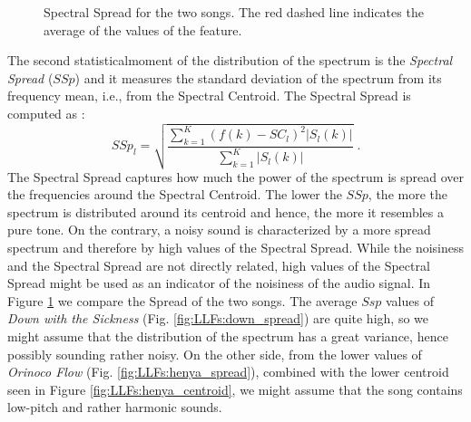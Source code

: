 \begin{figure}[tb]
	\centering
	 \hfil
	\caption{Spectral Spread for the two songs. The red dashed line indicates the average of the values of the feature.}
	\label{fig:LLFs:spread}          
\end{figure}

The second statisticalmoment of the distribution of the spectrum is the \textit{Spectral Spread} ($SSp$) and it measures the standard deviation of the spectrum from its frequency mean, i.e., from the Spectral Centroid. The Spectral Spread is computed as :
\begin{equation}\label{eq:FSS}
SSp_l = \sqrt{\frac{\sum\limits_{k=1}^{K}(f(k)-SC_l)^2 |S_l(k)|}{\sum\limits_{k=1}^{K}|S_l(k)|}} \;.
\end{equation}
The Spectral Spread captures how much the power of the spectrum is spread over the frequencies around the Spectral Centroid. The lower the $SSp$, the more the spectrum is distributed around its centroid and hence, the more it resembles a pure tone. On the contrary, a noisy sound is characterized by a more spread spectrum and therefore by high values of the Spectral Spread. While the noisiness and the Spectral Spread are not directly related, high values of the Spectral Spread might be used as an indicator of the noisiness of the audio signal. In Figure \ref{fig:LLFs:spread} we compare the Spread of the two songs. The average $Ssp$ values of \textit{Down with the Sickness} (Fig. \ref{fig:LLFs:down_spread}) are quite high, so we might assume that the distribution of the spectrum has a great variance, hence possibly sounding rather noisy. On the other side, from the lower values of \textit{Orinoco Flow} (Fig. \ref{fig:LLFs:henya_spread}), combined with the lower centroid seen in Figure \ref{fig:LLFs:henya_centroid}, we might assume that the song contains low-pitch and rather harmonic sounds.


